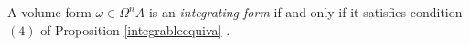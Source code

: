 \documentclass{amsart}
\theoremstyle{definition}
\theoremstyle{remark}
\numberwithin{equation}{section}
\begin{document}
A volume form $\omega\in \Omega^nA$ is an {\em integrating form} if and only if it satisfies condition $(4)$ of Proposition \ref{integrableequiva} \cite[Remark 2.3]{BrzezinskiSitarz2017}.


    



\end{document}
